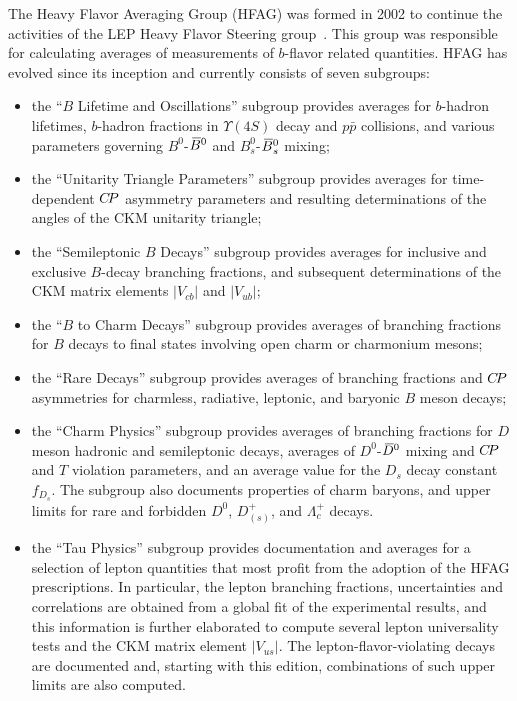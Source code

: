 The Heavy Flavor Averaging Group (HFAG) was formed in 2002 to 
continue the activities of the LEP Heavy Flavor Steering 
group~\cite{Abbaneo:2000ej_mod,*Abbaneo:2001bv_mod_cont}. 
This group was responsible for calculating averages of 
measurements of $b$-flavor related quantities. HFAG has evolved 
since its inception and currently consists of seven subgroups:
% 
\begin{itemize}
\item the ``$B$ Lifetime and Oscillations'' subgroup provides 
averages for $b$-hadron lifetimes, $b$-hadron fractions in 
$\Upsilon(4S)$ decay and $p\bar{p}$ collisions, and various 
parameters governing $B^0$-$\kern 0.18em\overline{\kern -0.18em B}{}^0$ and $B_s^0$-$\kern 0.18em\overline{\kern -0.18em B}{}_s^0$ mixing;

\item the ``Unitarity Triangle Parameters'' subgroup provides
averages for time-dependent $C\!P$ asymmetry parameters and 
resulting determinations of the angles of the CKM unitarity triangle;

\item the ``Semileptonic $B$ Decays'' subgroup provides averages
for inclusive and exclusive $B$-decay branching fractions, and
subsequent determinations of the CKM matrix elements 
$|V_{cb}|$ and $|V_{ub}|$;

\item the ``$B$ to Charm Decays'' subgroup provides averages of 
branching fractions for $B$ decays to final states involving open 
charm or charmonium mesons;

\item the ``Rare Decays'' subgroup provides averages of branching 
fractions and $C\!P$ asymmetries for charmless, radiative, 
leptonic, and baryonic $B$ meson decays;

\item the ``Charm Physics'' subgroup provides averages of branching 
fractions for $D$ meson hadronic and semileptonic decays, 
averages of $D^0$-$\kern 0.2em\overline{\kern -0.2em D}{}^0$ mixing and $C\!P$ and $T$ violation parameters, 
and an average value for the $D^{}_s$ decay constant~$f^{}_{D_s}$.
The subgroup also documents properties of charm baryons, and upper 
limits for rare and forbidden $D^0$, $D^+_{(s)}$, and $\Lambda_c^+$ 
decays.

\item the ``Tau Physics'' subgroup provides documentation and
averages for a selection of \mtau lepton quantities that most profit
from the adoption of the HFAG prescriptions. In particular, the \mtau
lepton branching fractions, uncertainties and correlations are
obtained from a global fit of the experimental results, and this
information is further elaborated to compute several lepton
universality tests and the CKM matrix element $|V_{us}|$. The \mtau
lepton-flavor-violating decays are documented and, starting with this
edition, combinations of such upper limits are also computed.
\end{itemize}

